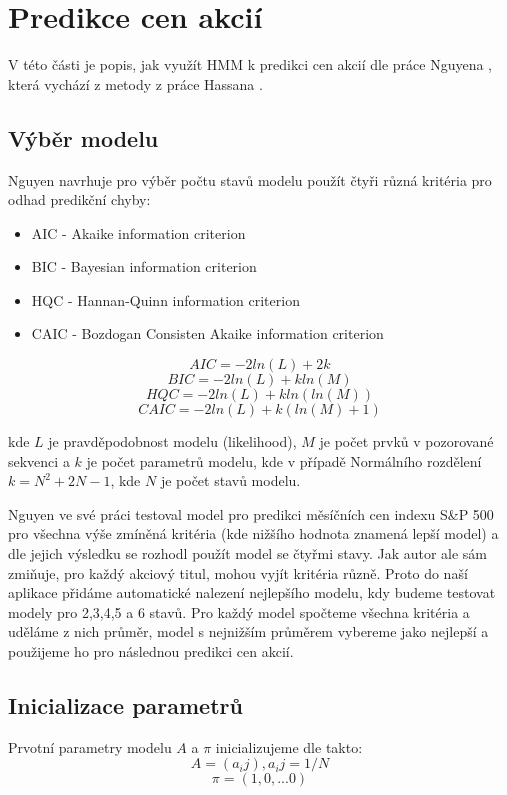 \section{Predikce cen akcií}

V této části je popis, jak využít HMM k predikci cen akcií dle práce Nguyena \cite{Nguyen}, která vychází z
metody z práce Hassana \cite{Hassan}.

\subsection{Výběr modelu}
Nguyen navrhuje pro výběr počtu stavů modelu použít čtyři různá kritéria pro odhad predikční chyby:
\begin{itemize}
    \item AIC - Akaike information criterion
    \item BIC - Bayesian information criterion
    \item HQC - Hannan-Quinn information criterion
    \item CAIC - Bozdogan Consisten Akaike information criterion
\end{itemize}

\[ AIC = -2ln(L) + 2k \]
\[ BIC = -2ln(L) + kln(M) \]
\[ HQC = -2ln(L) + kln(ln(M)) \]
\[ CAIC = -2ln(L) + k(ln(M) + 1) \]

kde \(L\) je pravděpodobnost modelu (likelihood), \(M\) je počet prvků v pozorované sekvenci a \(k\) je počet parametrů modelu, kde v případě Normálního rozdělení \(k = N^2 + 2N - 1\), kde \(N\) je počet stavů modelu.

Nguyen ve své práci testoval model pro predikci měsíčních cen indexu S\&P 500 pro všechna výše zmíněná kritéria (kde nižšího hodnota znamená lepší model) a dle jejich výsledku se rozhodl použít model se čtyřmi stavy. Jak autor ale sám zmiňuje, pro každý akciový titul, mohou vyjít kritéria různě. Proto do naší aplikace přidáme automatické nalezení nejlepšího modelu, kdy budeme testovat modely pro 2,3,4,5 a 6 stavů. Pro každý model spočteme všechna kritéria a uděláme z nich průměr, model s nejnižším průměrem vybereme jako nejlepší a použijeme ho pro následnou predikci cen akcií.

\subsection{Inicializace parametrů}
Prvotní parametry modelu \(A\) a \(\pi\) inicializujeme dle \cite{Nguyen} takto:
\[ A = (a_ij), a_ij = 1/N \]
\[ \pi = (1,0,...0) \]

